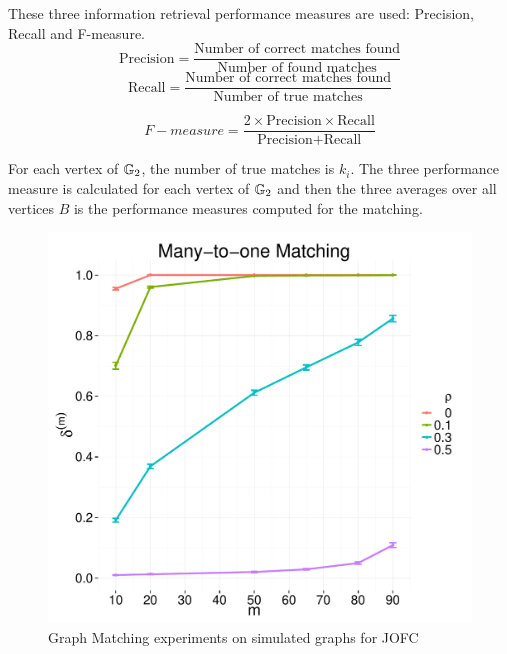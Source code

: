 \documentclass[12pt,oneside,final]{thesis}\usepackage[]{graphicx}\usepackage[]{color}
\begin{document}
These three information retrieval performance measures are used: Precision, Recall and F-measure.
$$\mathrm{Precision} =\frac{\textrm{Number of correct matches found}}{\textrm{Number of found matches}}$$
$$\mathrm{Recall}    =\frac{\textrm{Number of correct matches found}}{\textrm{Number of true matches}}$$

$$F-measure  =\frac{2 \times \textrm{Precision} \times \textrm{Recall}}{\textrm{Precision} + \textrm{Recall}}$$

For each vertex of $\mathbb{G}_2$, the number of true matches is $k_i$. The three performance measure is calculated for each vertex of $\mathbb{G}_2$ and then the three averages over all vertices $B$ is the performance measures computed for the  matching.

\begin{figure}
\includegraphics[scale=0.65]{Total_precision_JOFC_1_to_k_match_paper.pdf}
\caption{Graph Matching experiments on simulated graphs for JOFC \label{1_k_graphmatch_sim}}
\end{figure}
\end{document}
